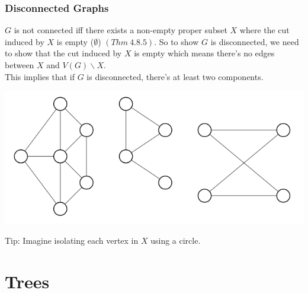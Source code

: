 \documentclass[11pt]{article}
\newcommand{\nl}{\\[5pt]}
\begin{document}
\subsubsection{Disconnected Graphs}
$G$ is not connected iff there exists a non-empty proper subset $X$ where the cut induced by $X$ is empty ($\emptyset$) $(Thm \: 4.8.5)$. So to show $G$ is disconnected, we need to show that the cut induced by $X$ is empty which means there's no edges between $X$ and $V(G) \backslash X$. \nl 
This implies that if $G$ is disconnected, there's at least two components.
\begin{center}
    \includegraphics[scale=0.5]{Figures/Disconnected.png}
\end{center}
Tip: Imagine isolating each vertex in $X$ using a circle. 

\newpage 
\section{Trees}
\end{document}
